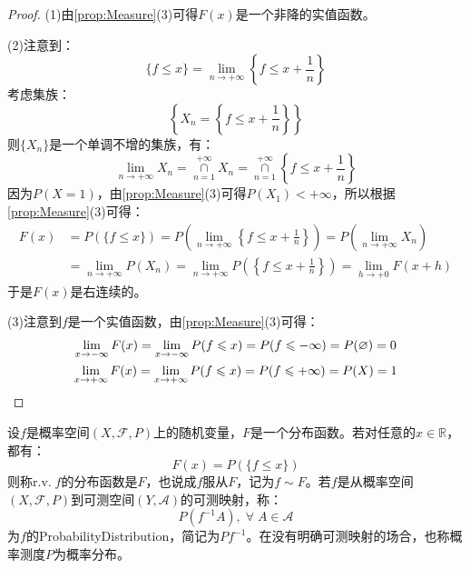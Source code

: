 \begin{proof}
	(1)由\cref{prop:Measure}(3)可得$F(x)$是一个非降的实值函数。\par
	(2)注意到：
	\begin{equation*}
		\{f\leqslant x\}=\lim_{n\to+\infty}\left\{f\leqslant x+\frac{1}{n}\right\}
	\end{equation*}
	考虑集族：
	\begin{equation*}
		\left\{X_n=\left\{f\leqslant x+\frac{1}{n}\right\}\right\}
	\end{equation*}
	则$\{X_n\}$是一个单调不增的集族，有：
	\begin{equation*}
		\lim_{n\to+\infty}X_n=\underset{n=1}{\overset{+\infty}{\cap}}X_n=\underset{n=1}{\overset{+\infty}{\cap}}\left\{f\leqslant x+\frac{1}{n}\right\}
	\end{equation*}
	因为$P(X=1)$，由\cref{prop:Measure}(3)可得$P(X_1)<+\infty$，所以根据\cref{prop:Measure}(3)可得：
	\begin{align*}
		F(x)&=P(\{f\leqslant x\})
		=P\left(\lim_{n\to+\infty}\left\{f\leqslant x+\frac{1}{n}\right\}\right)
		=P\left(\lim_{n\to+\infty}X_n\right) \\
		&=\lim_{n\to+\infty}P(X_n)
		=\lim_{n\to+\infty}P\left(\left\{f\leqslant x+\frac{1}{n}\right\}\right)
		=\lim_{h\to+0}F(x+h)
	\end{align*}
	于是$F(x)$是右连续的。\par
	(3)注意到$f$是一个实值函数，由\cref{prop:Measure}(3)可得：
	\begin{gather*}
		\lim_{x\to-\infty}F(x)=\lim_{x\to-\infty}P(f\leqslant x)=P(f\leqslant-\infty)=P(\varnothing)=0 \\
		\lim_{x\to+\infty}F(x)=\lim_{x\to+\infty}P(f\leqslant x)=P(f\leqslant+\infty)=P(X)=1\qedhere
	\end{gather*}
\end{proof}
\begin{definition}
	设$f$是概率空间$(X,\mathscr{F},P)$上的随机变量，$F$是一个分布函数。若对任意的$x\in\mathbb{R}$，都有：
	\begin{equation*}
		F(x)=P(\{f\leqslant x\})
	\end{equation*}
	则称r.v.$\;f$的分布函数是$F$，也说成$f$服从$F$，记为$f\sim F$。若$f$是从概率空间$(X,\mathscr{F},P)$到可测空间$(Y,\mathscr{A})$的可测映射，称：
	\begin{equation*}
		P(f^{-1}A),\;\forall\;A\in \mathscr{A}
	\end{equation*}
	为$f$的\gls{ProbabilityDistribution}，简记为$Pf^{-1}$。在没有明确可测映射的场合，也称概率测度$P$为概率分布。
\end{definition}
